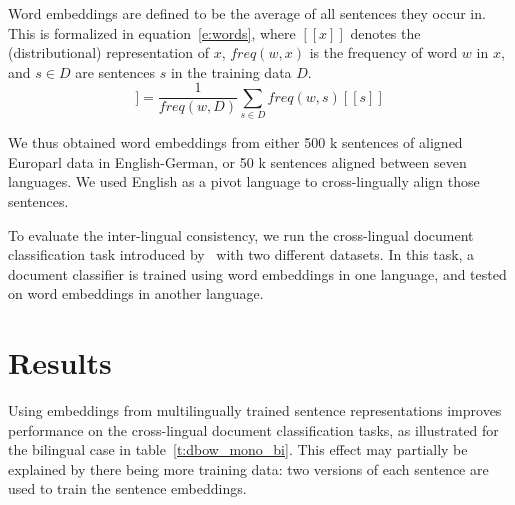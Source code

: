 \documentclass[a4paper,11pt]{article}
\begin{document}
Word embeddings are defined to be the average of all sentences they occur in. This is  formalized in equation~\ref{e:words}, where $[\![ x ]\!]$ denotes the (distributional) representation of $x$, $freq(w,x)$ is the frequency of word $w$ in $x$, and $s\in D$ are sentences $s$ in the training data $D$.
\begin{equation}
[\![ w ]\!] =\frac{1}{freq(w,D)}\sum_{s\in D}freq(w,s) [\![ s ]\!]
\label{e:words}
\end{equation}

We thus obtained word embeddings from either 500 k sentences of aligned Europarl data in English-German, or 50 k sentences aligned between seven languages. We used English as a pivot language to cross-lingually align those sentences.


To evaluate the inter-lingual consistency, we run the cross-lingual document classification task introduced by~\cite{klementiev2012inducing} with two different datasets. In this task, a document classifier is trained using word embeddings in one language, and tested on word embeddings in another language. 


\section*{Results}
Using embeddings from multilingually trained sentence representations improves performance on the cross-lingual document classification tasks, as illustrated for the bilingual case in table~\ref{t:dbow_mono_bi}. This effect may partially be explained by there being more training data: two versions of each sentence are used to train the sentence embeddings. 
\end{document}
